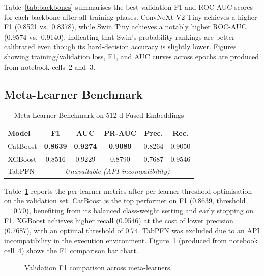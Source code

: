 \documentclass[conference]{IEEEtran}
\begin{document}
Table~\ref{tab:backbones} summarises the best validation F1 and ROC-AUC scores
for each backbone after all training phases.  ConvNeXt V2 Tiny achieves a
higher F1 (0.8521 vs.\ 0.8378), while Swin Tiny achieves a notably higher
ROC-AUC (0.9574 vs.\ 0.9140), indicating that Swin's probability rankings are
better calibrated even though its hard-decision accuracy is slightly lower.
Figures showing training/validation loss, F1, and AUC curves across epochs are
produced from notebook cells~2 and~3.

\subsection{Meta-Learner Benchmark}

\begin{table}[t]
  \caption{Meta-Learner Benchmark on 512-d Fused Embeddings}
  \label{tab:metalearners}
  \centering
  \setlength{\tabcolsep}{4pt}
  \begin{tabular}{lccccc}
    \toprule
    \textbf{Model} & \textbf{F1} & \textbf{AUC} & \textbf{PR-AUC} & \textbf{Prec.} & \textbf{Rec.} \\
    \midrule
    CatBoost  & \textbf{0.8639} & \textbf{0.9274} & \textbf{0.9089} & 0.8264 & 0.9050 \\
    XGBoost   & 0.8516          & 0.9229          & 0.8790          & 0.7687 & 0.9546 \\
    TabPFN    & \multicolumn{5}{c}{\textit{Unavailable (API incompatibility)}} \\
    \bottomrule
  \end{tabular}
\end{table}

Table~\ref{tab:metalearners} reports the per-learner metrics after
per-learner threshold optimisation on the validation set.  CatBoost is the top
performer on F1 (0.8639, threshold~$=0.70$), benefiting from its balanced
class-weight setting and early stopping on F1.  XGBoost achieves higher recall
(0.9546) at the cost of lower precision (0.7687), with an optimal threshold of
0.74.  TabPFN was excluded due to an API incompatibility in the execution
environment.  Figure~\ref{fig:metabars} (produced from notebook cell~4) shows
the F1 comparison bar chart.

\begin{figure}[t]
  \centering
  \caption{Validation F1 comparison across meta-learners.}
  \label{fig:metabars}
\end{figure}
\end{document}
